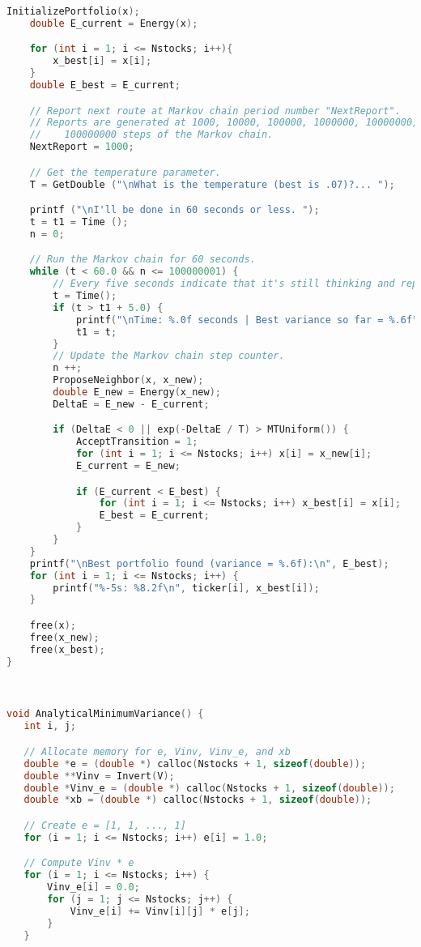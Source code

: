 \documentclass{report}
\begin{document}
\begin{lstlisting}[language=C++]
    InitializePortfolio(x);
    double E_current = Energy(x);

    for (int i = 1; i <= Nstocks; i++){ 
        x_best[i] = x[i];
    }
    double E_best = E_current;

    // Report next route at Markov chain period number "NextReport".
    // Reports are generated at 1000, 10000, 100000, 1000000, 10000000, and
    //    100000000 steps of the Markov chain.
    NextReport = 1000;

    // Get the temperature parameter.
    T = GetDouble ("\nWhat is the temperature (best is .07)?... ");

    printf ("\nI'll be done in 60 seconds or less. ");
    t = t1 = Time ();
    n = 0;

    // Run the Markov chain for 60 seconds.
    while (t < 60.0 && n <= 100000001) {
        // Every five seconds indicate that it's still thinking and report variance.
        t = Time();
        if (t > t1 + 5.0) {
            printf("\nTime: %.0f seconds | Best variance so far = %.6f", t, E_best);
            t1 = t;
        }
        // Update the Markov chain step counter.
        n ++;
        ProposeNeighbor(x, x_new);
        double E_new = Energy(x_new);
        DeltaE = E_new - E_current;

        if (DeltaE < 0 || exp(-DeltaE / T) > MTUniform()) {
            AcceptTransition = 1;
            for (int i = 1; i <= Nstocks; i++) x[i] = x_new[i];
            E_current = E_new;

            if (E_current < E_best) {
                for (int i = 1; i <= Nstocks; i++) x_best[i] = x[i];
                E_best = E_current;
            }
        }
    }
    printf("\nBest portfolio found (variance = %.6f):\n", E_best);
    for (int i = 1; i <= Nstocks; i++) {
        printf("%-5s: %8.2f\n", ticker[i], x_best[i]);
    }

    free(x);
    free(x_new);
    free(x_best);
}



void AnalyticalMinimumVariance() {
   int i, j;

   // Allocate memory for e, Vinv, Vinv_e, and xb
   double *e = (double *) calloc(Nstocks + 1, sizeof(double));
   double **Vinv = Invert(V);
   double *Vinv_e = (double *) calloc(Nstocks + 1, sizeof(double));
   double *xb = (double *) calloc(Nstocks + 1, sizeof(double));

   // Create e = [1, 1, ..., 1]
   for (i = 1; i <= Nstocks; i++) e[i] = 1.0;

   // Compute Vinv * e
   for (i = 1; i <= Nstocks; i++) {
       Vinv_e[i] = 0.0;
       for (j = 1; j <= Nstocks; j++) {
           Vinv_e[i] += Vinv[i][j] * e[j];
       }
   }


\end{lstlisting}
\end{document}
